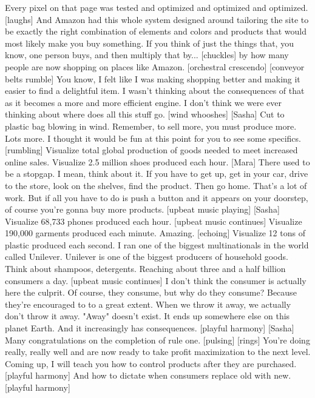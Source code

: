 \documentclass[a4paper]{article}
\begin{document}
	Every pixel on that page was
	tested and optimized and optimized and optimized.
	[laughs] And Amazon had this whole system designed around
	tailoring the site to be exactly
	the right combination of elements and colors and products
	that would most likely make you buy something.
	If you think of just the things that, you know, one person buys,
	and then multiply that by... [chuckles]
	by how many people are now shopping on places like Amazon.
	[orchestral crescendo]
	[conveyor belts rumble]
	You know, I felt like I was making shopping better
	and making it easier to find a delightful item.
	I wasn't thinking about the consequences of that
	as it becomes a more and more efficient engine.
	I don't think we were ever thinking about where does all this stuff go.
	[wind whooshes]
	[Sasha] Cut to plastic bag blowing in wind.
	Remember, to sell more, you must produce more.
	Lots more.
	I thought it would be fun at this point for you to see some specifics.
	[rumbling]
	Visualize total global production
	of goods needed to meet increased online sales.
	Visualize 2.5 million shoes produced each hour.
	[Mara] There used to be a stopgap.
	I mean, think about it.
	If you have to get up, get in your car,
	drive to the store,
	look on the shelves, find the product.
	Then go home.
	That's a lot of work.
	But if all you have to do is push a button
	and it appears on your doorstep,
	of course you're gonna buy more products.
	[upbeat music playing]
	[Sasha] Visualize 68,733 phones produced each hour.
	[upbeat music continues]
	Visualize 190,000 garments produced each minute.
	Amazing. [echoing]
	Visualize 12 tons of plastic produced each second.
	I ran one of the biggest multinationals in the world called Unilever.
	Unilever is one of the biggest producers
	of household goods.
	Think about shampoos, detergents.
	Reaching about three and a half billion consumers a day.
	[upbeat music continues]
	I don't think the consumer is actually here the culprit.
	Of course, they consume, but why do they consume?
	Because they're encouraged to to a great extent.
	When we throw it away, we actually don't throw it away.
	"Away" doesn't exist.
	It ends up somewhere else on this planet Earth.
	And it increasingly has consequences.
	[playful harmony]
	[Sasha] Many congratulations on the completion of rule one.
	[pulsing]
	[rings]
	You're doing really, really well
	and are now ready to take profit maximization to the next level.
	Coming up,
	I will teach you how to control products after they are purchased.
	[playful harmony]
	And how to dictate when consumers replace old with new.
	[playful harmony]
\end{document}
